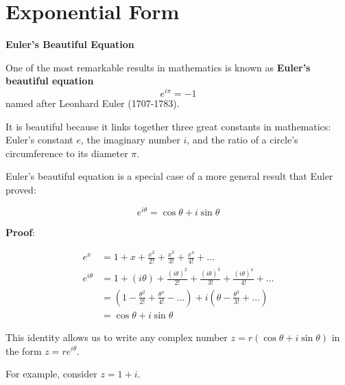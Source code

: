 \documentclass[11pt,a4paper]{book}
\begin{document}
\newpage

\section{Exponential Form}

\begin{tcolorbox}[colback=blue!5, colframe=black, boxrule=.4pt, sharpish corners]

\begin{tcolorbox}[skin=enhancedlast, width=\textwidth, interior style={left color=blue!5,right color=blue!35}, colframe=blue!35, arc=3mm, sharp corners=east,halign=right]

\textbf{\large{}Euler's Beautiful Equation}{\large\par}

\end{tcolorbox}

\medskip{}

One of the most remarkable results in mathematics is known as \textbf{Euler's
beautiful equation}
\[
e^{i\pi}=-1
\]
named after Leonhard Euler (1707-1783).

\medskip{}

It is beautiful because it links together three great constants in
mathematics: Euler's constant $e$, the imaginary number $i$, and
the ratio of a circle's circumference to its diameter $\pi$.
\end{tcolorbox}
Euler's beautiful equation is a special case of a more general result
that Euler proved:

\[
e^{i\theta}=\cos\theta+i\sin\theta
\]

\textbf{Proof}:

\begin{align*}
e^{x} & =1+x+\frac{x^{2}}{2!}+\frac{x^{3}}{3!}+\frac{x^{4}}{4!}+\ldots\\
e^{i\theta} & =1+\left(i\theta\right)+\frac{\left(i\theta\right)^{2}}{2!}+\frac{\left(i\theta\right)^{3}}{3!}+\frac{\left(i\theta\right)^{4}}{4!}+\ldots\\
 & =\left(1-\frac{\theta^{2}}{2!}+\frac{\theta^{4}}{4!}-\ldots\right)+i\left(\theta-\frac{\theta^{3}}{3!}+\ldots\right)\\
 & =\cos\theta+i\sin\theta
\end{align*}

This identity allows us to write any complex number $z=r\left(\cos\theta+i\sin\theta\right)$
in the form $z=re^{i\theta}$.

For example, consider $z=1+i$.
\end{document}
